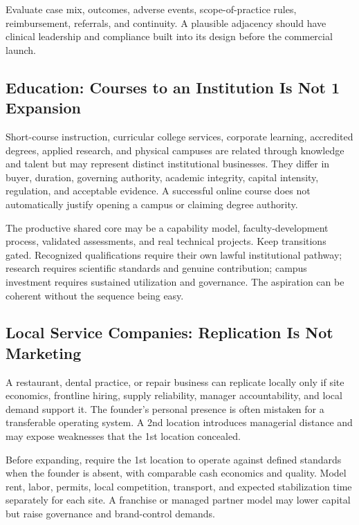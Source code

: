 Evaluate case mix, outcomes, adverse events, scope-of-practice rules, reimbursement, referrals, and continuity. A plausible adjacency should have clinical leadership and compliance built into its design before the commercial launch.

\subsection{Education: Courses to an Institution Is Not 1 Expansion}
\label{sec:education_courses_to_institution_not_one_expansion}

Short-course instruction, curricular college services, corporate learning, accredited degrees, applied research, and physical campuses are related through knowledge and talent but may represent distinct institutional businesses. They differ in buyer, duration, governing authority, academic integrity, capital intensity, regulation, and acceptable evidence. A successful online course does not automatically justify opening a campus or claiming degree authority.

The productive shared core may be a capability model, faculty-development process, validated assessments, and real technical projects. Keep transitions gated. Recognized qualifications require their own lawful institutional pathway; research requires scientific standards and genuine contribution; campus investment requires sustained utilization and governance. The aspiration can be coherent without the sequence being easy.

\subsection{Local Service Companies: Replication Is Not Marketing}
\label{sec:local_service_companies_replication}

A restaurant, dental practice, or repair business can replicate locally only if site economics, frontline hiring, supply reliability, manager accountability, and local demand support it. The founder's personal presence is often mistaken for a transferable operating system. A 2nd location introduces managerial distance and may expose weaknesses that the 1st location concealed.

Before expanding, require the 1st location to operate against defined standards when the founder is absent, with comparable cash economics and quality. Model rent, labor, permits, local competition, transport, and expected stabilization time separately for each site. A franchise or managed partner model may lower capital but raise governance and brand-control demands.

